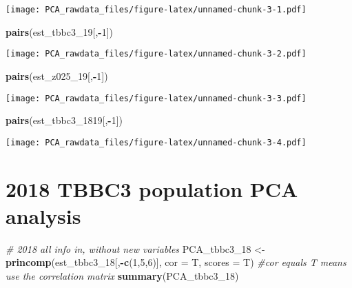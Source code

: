 \documentclass[]{article}
\newenvironment{Shaded}{\begin{snugshade}}{\end{snugshade}}
\newcommand{\CommentTok}[1]{\textcolor[rgb]{0.56,0.35,0.01}{\textit{#1}}}
\newcommand{\DataTypeTok}[1]{\textcolor[rgb]{0.13,0.29,0.53}{#1}}
\newcommand{\DecValTok}[1]{\textcolor[rgb]{0.00,0.00,0.81}{#1}}
\newcommand{\KeywordTok}[1]{\textcolor[rgb]{0.13,0.29,0.53}{\textbf{#1}}}
\newcommand{\NormalTok}[1]{#1}
\newcommand{\OperatorTok}[1]{\textcolor[rgb]{0.81,0.36,0.00}{\textbf{#1}}}
\newcommand{\StringTok}[1]{\textcolor[rgb]{0.31,0.60,0.02}{#1}}
\begin{document}
\texttt{[image: PCA\_rawdata\_files/figure-latex/unnamed-chunk-3-1.pdf]}

\begin{Shaded}
\begin{Highlighting}[]
\KeywordTok{pairs}\NormalTok{(est_tbbc3_}\DecValTok{19}\NormalTok{[,}\OperatorTok{-}\DecValTok{1}\NormalTok{])}
\end{Highlighting}
\end{Shaded}

\texttt{[image: PCA\_rawdata\_files/figure-latex/unnamed-chunk-3-2.pdf]}

\begin{Shaded}
\begin{Highlighting}[]
\KeywordTok{pairs}\NormalTok{(est_z025_}\DecValTok{19}\NormalTok{[,}\OperatorTok{-}\DecValTok{1}\NormalTok{])}
\end{Highlighting}
\end{Shaded}

\texttt{[image: PCA\_rawdata\_files/figure-latex/unnamed-chunk-3-3.pdf]}

\begin{Shaded}
\begin{Highlighting}[]
\KeywordTok{pairs}\NormalTok{(est_tbbc3_}\DecValTok{1819}\NormalTok{[,}\OperatorTok{-}\DecValTok{1}\NormalTok{])}
\end{Highlighting}
\end{Shaded}

\texttt{[image: PCA\_rawdata\_files/figure-latex/unnamed-chunk-3-4.pdf]}

\hypertarget{tbbc3-population-pca-analysis}{%
\section{2018 TBBC3 population PCA
analysis}\label{tbbc3-population-pca-analysis}}

\begin{Shaded}
\begin{Highlighting}[]
\CommentTok{# 2018 all info in, without new variables}
\NormalTok{PCA_tbbc3_}\DecValTok{18}\NormalTok{ <-}\StringTok{ }\KeywordTok{princomp}\NormalTok{(est_tbbc3_}\DecValTok{18}\NormalTok{[,}\OperatorTok{-}\KeywordTok{c}\NormalTok{(}\DecValTok{1}\NormalTok{,}\DecValTok{5}\NormalTok{,}\DecValTok{6}\NormalTok{)], }\DataTypeTok{cor =}\NormalTok{ T, }\DataTypeTok{scores =}\NormalTok{ T) }\CommentTok{#cor equals T means use the correlation matrix}
\KeywordTok{summary}\NormalTok{(PCA_tbbc3_}\DecValTok{18}\NormalTok{)}
\end{Highlighting}
\end{Shaded}
\end{document}
